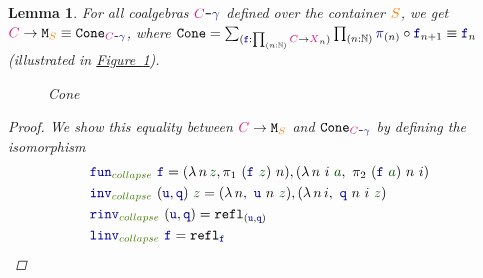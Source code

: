 \documentclass[twoside,11pt,openright]{report}
\theoremstyle{plain} %
\newtheorem{lem}[thm]{Lemma}
\theoremstyle{definition}
\theoremstyle{remark}
\newcommand*{\figref}[1]{\hyperref[fig:#1]{Figure~\ref*{fig:#1}}}
\newcommand*{\term}[1]{\textcolor{green!30!black}{#1}} %
\newcommand*{\pathterm}[1]{\textcolor{green!65!red!75!black}{#1}}
\newcommand*{\type}[1]{\textcolor{magenta!90!black}{#1}}
\newcommand*{\container}[1]{\textcolor{orange}{#1}}
\newcommand*{\coalg}[2]{#1\texttt{-}#2}
\newcommand*{\function}[1]{\textcolor{blue!60!black}{\ensuremath{\mathtt{#1}}}}
\newcommand*{\typeformer}[1]{\ensuremath{\mathtt{#1}}}
\begin{document}
\begin{lem}
  \label{lem:function-to-M-type-is-cone}
  For all coalgebras \(\coalg{\type{C}}{\function{\gamma}}\) defined over the container \(\container{S}\), we get \(\type{C} \rightarrow \typeformer{M}_{\container{S}} \equiv \typeformer{Cone}_{\coalg{\type{C}}{\function{\gamma}}}\), where \(\typeformer{Cone} = \sum_{(\function{f} : \prod_{(n : \mathbb{N})} \type{C} \rightarrow \type{X}_n)} \prod_{(n : \mathbb{N})} \function{\pi}_{(n)} \circ \function{f}_{n+1} \equiv \function{f}_n\) (illustrated in \figref{M-seq-cone}).
  \begin{figure}[h]
    \centering
    \caption{Cone}
    \label{fig:M-seq-cone}
  \end{figure}  
  \begin{proof}
    We show this equality between \(\type{C} \rightarrow \typeformer{M}_{\container{S}}\) and \(\typeformer{Cone}_{\coalg{\type{C}}{\function{\gamma}}}\) by defining the isomorphism
    \begin{align}
      &\function{fun}_{\pathterm{collapse}}~\function{f} = (\lambda\,n\,\term{z},\pi_1~(\function{f}~\term{z})~n),(\lambda\,n~i~\term{a},~\pi_2~(\function{f}~\term{a})~n~i) \\
      &\function{inv}_{\pathterm{collapse}}~(\function{u},\function{q})~\term{z} = (\lambda\,n,~\function{u}~n~\term{z}),(\lambda\,n\,i,~\function{q}~n~i~\term{z}) \\
      &\function{rinv}_{\pathterm{collapse}}~(\function{u},\function{q}) = \mathtt{refl}_{(\function{u},\function{q})} \\
      &\function{linv}_{\pathterm{collapse}}~\function{f} = \mathtt{refl}_{\function{f}}
    \end{align}
  \end{proof}
\end{lem}
\end{document}
